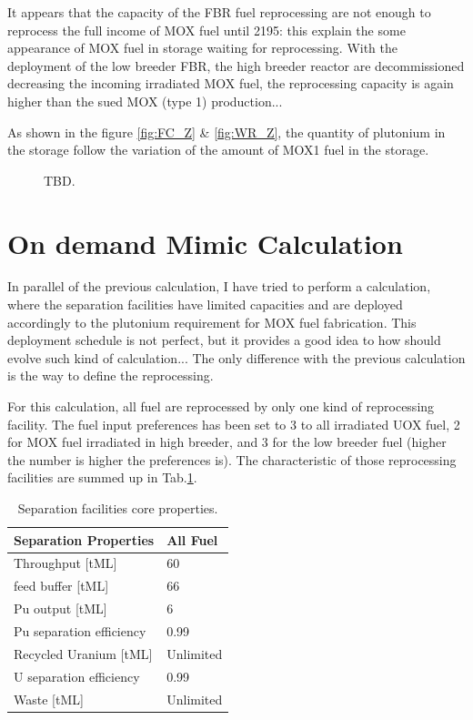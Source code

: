 \documentclass[12pt]{article}
\begin{document}
It appears that the capacity of the FBR fuel
reprocessing are not enough to reprocess the full
income of MOX fuel until 2195: this explain the
some appearance of MOX fuel in storage waiting for
reprocessing. With the deployment of the low
breeder FBR, the high breeder reactor are
decommissioned decreasing the incoming irradiated
MOX fuel,  the reprocessing capacity is again
higher than the sued MOX (type 1) production...


As shown in the figure \ref{fig:FC_Z} \&
\ref{fig:WR_Z}, the quantity of plutonium in the
storage follow the variation of the amount of MOX1
fuel in the storage.

\begin{figure}[h!]
\centering
{}
\caption{TBD.\label{fig:FC_WR_zoom} }
\end{figure}

\section{On demand Mimic Calculation}
In parallel of the previous calculation, I have
tried to perform a calculation, where the
separation facilities have limited capacities and
are deployed accordingly to the plutonium
requirement for MOX fuel fabrication. This
deployment schedule is not perfect, but it
provides a good idea to how should evolve such
kind of calculation...
The only difference with the previous calculation
is the way to define the reprocessing.

For this calculation, all fuel are reprocessed by
only one kind of reprocessing facility. The fuel
input preferences has been set to 3 to all
irradiated UOX fuel, 2 for MOX fuel irradiated in
high breeder, and 3 for the low breeder fuel
(higher the number is higher the preferences is).
The characteristic of those reprocessing
facilities are summed up in
Tab.\ref{tab:fuelfab_2}.

\begin{table}[h!]
\centering
\begin{tabular}{ll}
\hline
Separation Properties	&	All Fuel	\\
\hline
Throughput [tML]		&	60		\\
feed buffer [tML]		&	66		\\
Pu output  [tML]		&	6		\\
Pu separation efficiency	&	0.99		\\
Recycled Uranium [tML]	&	Unlimited	\\
U separation efficiency	&	0.99		\\
Waste [tML]			&	Unlimited	\\
\hline
\end{tabular}
\caption{Separation facilities core properties.}
\label{tab:fuelfab_2}
\end{table}
\end{document}
